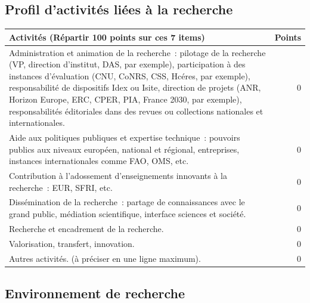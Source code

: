 \documentclass[]{article}
\begin{document}
\subsection{Profil d'activités liées à la recherche}


\begin{tabular}{ |p{16cm}|r|  }
\hline
\rowcolor{gray!40}
Activités (Répartir 100 points sur ces 7 items) &  Points   \\
\hline
Administration et animation de la recherche : pilotage de la recherche (VP, direction d’institut, DAS, par exemple), participation à des instances d’évaluation (CNU, CoNRS, CSS, Hcéres, par exemple), responsabilité de dispositifs Idex ou Isite, direction de projets (ANR, Horizon Europe, ERC, CPER, PIA, France 2030, par exemple), responsabilités éditoriales dans des revues ou collections nationales et internationales. & 0 \\
\hline
Aide aux politiques publiques et expertise technique : pouvoirs publics aux niveaux européen, national et régional, entreprises, instances internationales comme FAO, OMS, etc. & 0 \\
\hline
Contribution à l’adossement d’enseignements innovants à la recherche : EUR, SFRI, etc. & 0 \\
Dissémination de la recherche : partage de connaissances avec le grand public, médiation scientifique, interface sciences et société. & 0 \\
\hline
Recherche et encadrement de la recherche. & 0 \\
\hline
Valorisation, transfert, innovation. & 0 \\
\hline
Autres activités. (à préciser en une ligne maximum). & 0 \\
\hline
\end{tabular}

\subsection{Environnement de recherche}
\end{document}
